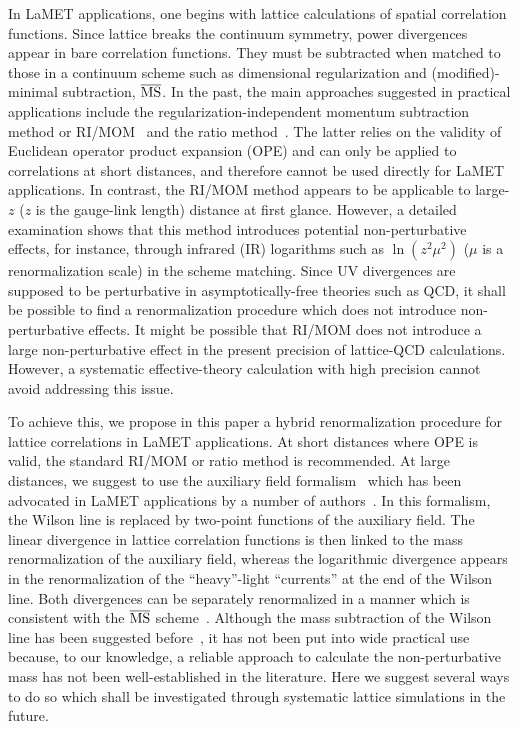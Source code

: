 \documentclass[preprint,12pt]{elsarticle}
\begin{document}
In LaMET applications, one begins with lattice calculations of spatial correlation functions. Since lattice
breaks the continuum symmetry, power divergences
appear in bare correlation functions. They must be subtracted
when matched to those in a continuum scheme such as dimensional regularization
and (modified)-minimal subtraction, ${\overline {\rm MS}}$. In the past, the main
approaches suggested in practical applications include the regularization-independent momentum subtraction method
or RI/MOM~\cite{Constantinou:2017sej,Stewart:2017tvs,Alexandrou:2017huk,Chen:2017mzz} and the
ratio method~\cite{Radyushkin:2017cyf,Orginos:2017kos,Braun:2018brg,Li:2020xml}. The latter relies on
the validity of Euclidean operator product expansion (OPE) and can only be applied to
correlations at short distances, and therefore cannot be used directly for
LaMET applications.
In contrast, the RI/MOM method appears to be applicable to large-$z$ ($z$ is the gauge-link length)
distance at first glance. However, a detailed examination shows that this method introduces potential
non-perturbative effects, for instance, through infrared (IR) logarithms
such as $\ln(z^2\mu^2)$ ($\mu$ is a renormalization scale) in the scheme matching. Since UV divergences are supposed to be
perturbative in asymptotically-free theories such as QCD, it shall be possible to find a renormalization procedure which does not introduce  non-perturbative effects. It might be possible that RI/MOM does not introduce a large non-perturbative effect in the present precision
of lattice-QCD calculations. However, a systematic effective-theory
calculation with high precision cannot avoid addressing this issue.

To achieve this, we propose in this paper a hybrid renormalization procedure for lattice correlations in LaMET applications. At short distances
where OPE is valid,
the standard RI/MOM or ratio method is recommended.
At large distances, we suggest to use the auxiliary field formalism~\cite{Samuel:1978iy,Gervais:1979fv,Arefeva:1980zd,Dorn:1986dt} which has been advocated in LaMET
applications by a number of authors~\cite{Ji:2017oey,Green:2017xeu,Green:2020xco}.
In this formalism, the Wilson line is replaced by two-point functions of the auxiliary field. The linear divergence in
lattice correlation functions is then linked to the mass
renormalization of the auxiliary field, whereas the
logarithmic divergence appears in the renormalization of
the ``heavy''-light ``currents'' at the end of the Wilson line.
Both divergences can be separately renormalized in a manner which is consistent
with the $\overline{\rm MS}$ scheme~\cite{Green:2017xeu,
Green:2020xco}.  Although
the mass subtraction of the Wilson
line has been suggested before~\cite{Chen:2016fxx,Ishikawa:2017faj},
it has not been put into wide practical use because, to our knowledge,
a reliable approach to calculate the non-perturbative mass has not been well-established
in the literature. Here we suggest several ways to do so which shall be investigated through systematic
lattice simulations in the future.
\end{document}
